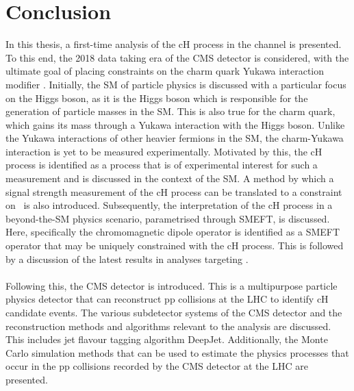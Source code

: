 \chapter{Conclusion}
In this thesis, a first-time analysis of the cH process in the \cHZZ channel is presented. To this end, the 2018 data taking era of the CMS detector is considered, with the ultimate goal of placing constraints on the charm quark Yukawa interaction modifier \kappac. Initially, the SM of particle physics is discussed with a particular focus on the Higgs boson, as it is the Higgs boson which is responsible for the generation of particle masses in the SM. This is also true for the charm quark, which gains its mass through a Yukawa interaction with the Higgs boson. Unlike the Yukawa interactions of other heavier fermions in the SM, the charm-Yukawa interaction is yet to be measured experimentally. Motivated by this, the cH process is identified as a process that is of experimental interest for such a measurement and is discussed in the context of the SM. A method by which a signal strength measurement of the cH process can be translated to a constraint on \kappac\, is also introduced. Subsequently, the interpretation of the cH process in a beyond-the-SM physics scenario, parametrised through SMEFT, is discussed. Here, specifically the chromomagnetic dipole operator is identified as a SMEFT operator that may be uniquely constrained with the cH process. This is followed by a discussion of the latest results in analyses targeting \kappac. \\
\\
Following this, the CMS detector is introduced. This is a multipurpose particle physics detector that can reconstruct pp collisions at the LHC to identify cH candidate events. The various subdetector systems of the CMS detector and the reconstruction methods and algorithms relevant to the analysis are discussed. This includes jet flavour tagging algorithm \textsf{DeepJet}. Additionally, the Monte Carlo simulation methods that can be used to estimate the physics processes that occur in the pp collisions recorded by the CMS detector at the LHC are presented. \\
\\
